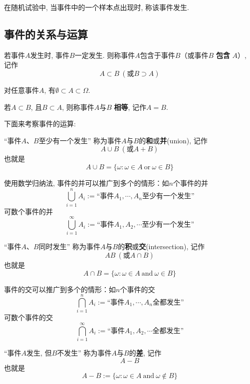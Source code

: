 在随机试验中, 当事件中的一个样本点出现时, 称该事件发生.

\subsection{事件的关系与运算}

\begin{definition}[事件的关系]
    若事件$A$发生时, 事件$B$一定发生. 则称事件$A$包含于事件$B$（或事件$B$ \textbf{包含} $A$）, 记作
    $$A\subset B \ (\text{或}B\supset A)$$

    对任意事件$A$, 有$\emptyset \subset A\subset \Omega$.

    若$A\subset B$, 且$B\subset A$, 则称事件$A$与$B$ \textbf{相等}, 记作$A=B$.

\end{definition}

下面来考察事件的运算:

\begin{definition}[事件的并]

    ``事件$A$、$B$至少有一个发生''
    称为事件$A$与$B$的\textbf{和}或\textbf{并}(union), 记作
    $$A\cup B \ (\text{或}A+B)$$
    也就是
    $$A\cup B=\{\omega : \omega\in A \ \text{or}\ \omega\in B\}$$
\end{definition}

\begin{remark}
    使用数学归纳法, 事件的并可以推广到多个的情形：如$n$个事件的并
    $$\bigcup_{i=1}^{n} A_i :=\text{``事件$A_1, \cdots, A_n$至少有一个发生''}$$
    可数个事件的并
    $$\bigcup_{i=1}^{\infty} A_i :=\text{``事件$A_1, A_2, \cdots$至少有一个发生''}$$
\end{remark}

\begin{definition}
    ``事件$A$、$B$同时发生''
    称为事件$A$与$B$的\textbf{积}或\textbf{交}(intersection), 记作
    $$AB \ (\text{或}A\cap B)$$
    也就是$$A\cap B=\{\omega : \omega\in A \ \text{and}\ \omega\in B\}$$
\end{definition}

\begin{remark}
    事件的交可以推广到多个的情形：如$n$个事件的交
    $$\bigcap_{i=1}^{n} A_i :=\text{``事件$A_1, \cdots, A_n$全都发生''}$$
    可数个事件的交
    $$\bigcap_{i=1}^{\infty} A_i :=\text{``事件$A_1, A_2, \cdots$全都发生''}$$
\end{remark}

\begin{definition}
    ``事件$A$发生, 但$B$不发生''
    称为事件$A$与$B$的\textbf{差}, 记作
    $$A-B$$
    也就是
    $$A- B:=\{\omega : \omega\in A \ \text{and}\ \omega\notin B\}$$
\end{definition}

